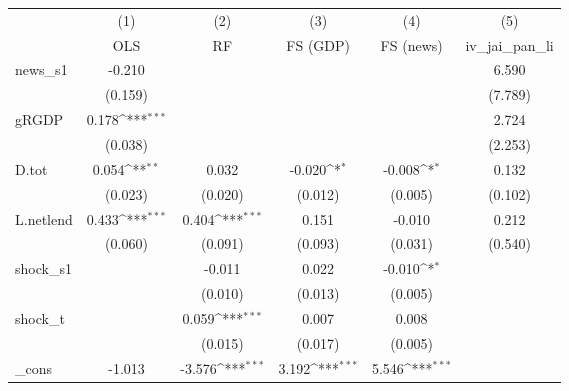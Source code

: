 {
\def\sym#1{\ifmmode^{#1}\else\(^{#1}\)\fi}
\begin{tabular}{l*{5}{c}}
\toprule
            &\multicolumn{1}{c}{(1)}&\multicolumn{1}{c}{(2)}&\multicolumn{1}{c}{(3)}&\multicolumn{1}{c}{(4)}&\multicolumn{1}{c}{(5)}\\
            &\multicolumn{1}{c}{OLS}&\multicolumn{1}{c}{RF}&\multicolumn{1}{c}{FS (GDP)}&\multicolumn{1}{c}{FS (news)}&\multicolumn{1}{c}{iv\_jai\_pan\_li}\\
\midrule
news\_s1     &      -0.210         &                     &                     &                     &       6.590         \\
            &     (0.159)         &                     &                     &                     &     (7.789)         \\
\addlinespace
gRGDP       &       0.178\sym{***}&                     &                     &                     &       2.724         \\
            &     (0.038)         &                     &                     &                     &     (2.253)         \\
\addlinespace
D.tot       &       0.054\sym{**} &       0.032         &      -0.020\sym{*}  &      -0.008\sym{*}  &       0.132         \\
            &     (0.023)         &     (0.020)         &     (0.012)         &     (0.005)         &     (0.102)         \\
\addlinespace
L.netlend   &       0.433\sym{***}&       0.404\sym{***}&       0.151         &      -0.010         &       0.212         \\
            &     (0.060)         &     (0.091)         &     (0.093)         &     (0.031)         &     (0.540)         \\
\addlinespace
shock\_s1    &                     &      -0.011         &       0.022         &      -0.010\sym{*}  &                     \\
            &                     &     (0.010)         &     (0.013)         &     (0.005)         &                     \\
\addlinespace
shock\_t     &                     &       0.059\sym{***}&       0.007         &       0.008         &                     \\
            &                     &     (0.015)         &     (0.017)         &     (0.005)         &                     \\
\addlinespace
\_cons      &      -1.013         &      -3.576\sym{***}&       3.192\sym{***}&       5.546\sym{***}&                     \\

\end{tabular}}
